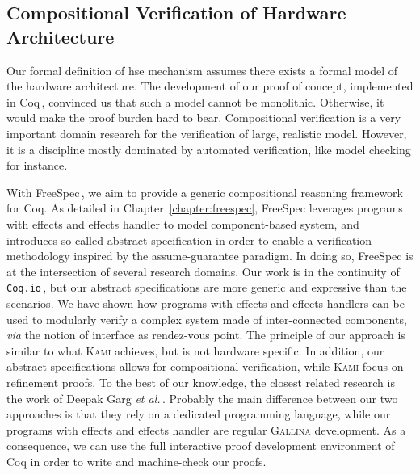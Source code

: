 \subsection{Compositional Verification of Hardware Architecture}

Our formal definition of \ac{hse} mechanism assumes there exists a formal model
of the hardware architecture.
%
The development of our proof of concept, implemented in
Coq\,\cite{letan2016speccertcode}, convinced us that such a model cannot be
monolithic.
%
Otherwise, it would make the proof burden hard to bear.
%
Compositional verification is a very important domain research for the
verification of large, realistic model.
%
However, it is a discipline mostly dominated by automated verification, like
model checking for instance.

With FreeSpec\,\cite{letan2018freespeccode}, we aim to provide a generic
compositional reasoning framework for Coq.
%
As detailed in Chapter~\ref{chapter:freespec}, FreeSpec leverages programs with
effects and effects handler to model component-based system, and introduces
so-called abstract specification in order to enable a verification methodology
inspired by the assume-guarantee paradigm.
%
In doing so, FreeSpec is at the intersection of several research domains.
%
Our work is in the continuity of \texttt{Coq.io}\,\cite{claret2015coqio}, but
our abstract specifications are more generic and expressive than the scenarios.
%
We have shown how programs with effects and effects handlers can be used to
modularly verify a complex system made of inter-connected components, \emph{via}
the notion of interface as rendez-vous point.
%
The principle of our approach is similar to what {\scshape Kami} achieves, but
is not hardware specific.
%
In addition, our abstract specifications allows for compositional verification,
while {\scshape Kami} focus on refinement proofs.
%
To the best of our knowledge, the closest related research is the work of Deepak
Garg \emph{et al.}\,\cite{garg2010compositional}.
%
Probably the main difference between our two approaches is that they rely on a
dedicated programming language, while our programs with effects and effects
handler are regular {\scshape Gallina} development.
%
As a consequence, we can use the full interactive proof development environment
of Coq in order to write and machine-check our proofs.
